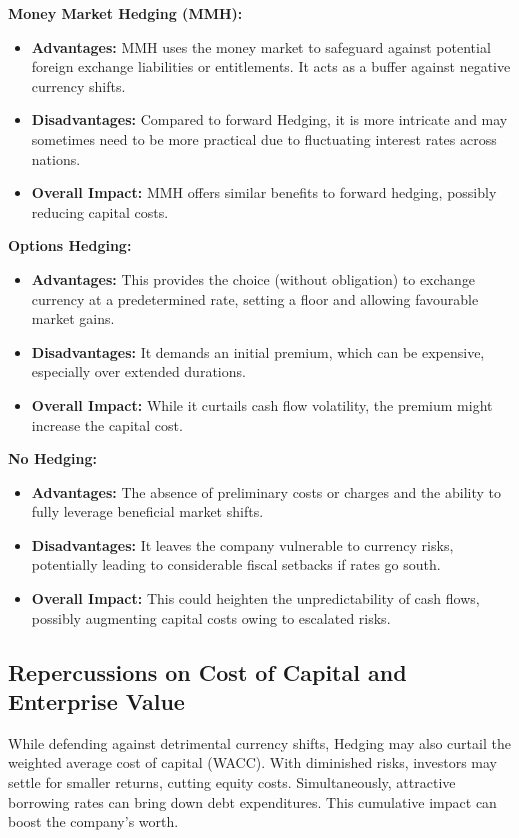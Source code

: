 \documentclass{article}
\let\Oldsubsection\subsection
\renewcommand{\subsection}{\FloatBarrier\Oldsubsection}
\begin{document}
\noindent \textbf{Money Market Hedging (MMH):}\\
\begin{itemize}
    \item \textbf{Advantages:} MMH uses the money market to safeguard against potential foreign exchange liabilities or entitlements. It acts as a buffer against negative currency shifts.
    \item \textbf{Disadvantages:} Compared to forward Hedging, it is more intricate and may sometimes need to be more practical due to fluctuating interest rates across nations.
    \item \textbf{Overall Impact:} MMH offers similar benefits to forward hedging, possibly reducing capital costs.\\
\end{itemize}

\noindent \textbf{Options Hedging:}\\
\begin{itemize}
    \item \textbf{Advantages:} This provides the choice (without obligation) to exchange currency at a predetermined rate, setting a floor and allowing favourable market gains.
    \item \textbf{Disadvantages:} It demands an initial premium, which can be expensive, especially over extended durations.
    \item \textbf{Overall Impact:} While it curtails cash flow volatility, the premium might increase the capital cost.\\
\end{itemize}

\noindent \textbf{No Hedging:}\\
\begin{itemize}
    \item \textbf{Advantages:} The absence of preliminary costs or charges and the ability to fully leverage beneficial market shifts.
    \item \textbf{Disadvantages:} It leaves the company vulnerable to currency risks, potentially leading to considerable fiscal setbacks if rates go south.
    \item \textbf{Overall Impact:} This could heighten the unpredictability of cash flows, possibly augmenting capital costs owing to escalated risks.\\
\end{itemize}

\subsection*{Repercussions on Cost of Capital and Enterprise Value}
\noindent While defending against detrimental currency shifts, Hedging may also curtail the weighted average cost of capital (WACC). With diminished risks, investors may settle for smaller returns, cutting equity costs. Simultaneously, attractive borrowing rates can bring down debt expenditures. This cumulative impact can boost the company's worth.\\
\end{document}
